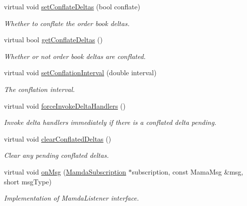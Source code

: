 \begin{CompactItemize}
virtual void \hyperlink{classWombat_1_1MamdaOrderBookListener_0b19000efe1f7135813b810dbe2e78ff}{set\-Conflate\-Deltas} (bool conflate)
\begin{CompactList}\small\item\em Whether to conflate the order book deltas. \item\end{CompactList}\item 
virtual bool \hyperlink{classWombat_1_1MamdaOrderBookListener_2f72b21861b1f4a0462624eaa236a298}{get\-Conflate\-Deltas} ()
\begin{CompactList}\small\item\em Whether or not order book deltas are conflated. \item\end{CompactList}\item 
virtual void \hyperlink{classWombat_1_1MamdaOrderBookListener_408fe065eeefd1322fb3c2f78751e806}{set\-Conflation\-Interval} (double interval)
\begin{CompactList}\small\item\em The conflation interval. \item\end{CompactList}\item 
virtual void \hyperlink{classWombat_1_1MamdaOrderBookListener_c3349c645be9a131ab64fc81ed203730}{force\-Invoke\-Delta\-Handlers} ()
\begin{CompactList}\small\item\em Invoke delta handlers immediately if there is a conflated delta pending. \item\end{CompactList}\item 
virtual void \hyperlink{classWombat_1_1MamdaOrderBookListener_46cdfacfe189842f46e8592eceff6724}{clear\-Conflated\-Deltas} ()
\begin{CompactList}\small\item\em Clear any pending conflated deltas. \item\end{CompactList}\item 
virtual void \hyperlink{classWombat_1_1MamdaOrderBookListener_25b4001c57c2a140040baad9f84bbec4}{on\-Msg} (\hyperlink{classWombat_1_1MamdaSubscription}{Mamda\-Subscription} $\ast$subscription, const Mama\-Msg \&msg, short msg\-Type)
\begin{CompactList}\small\item\em Implementation of Mamda\-Listener interface. \item\end{CompactList}\item 

\end{CompactItemize}
